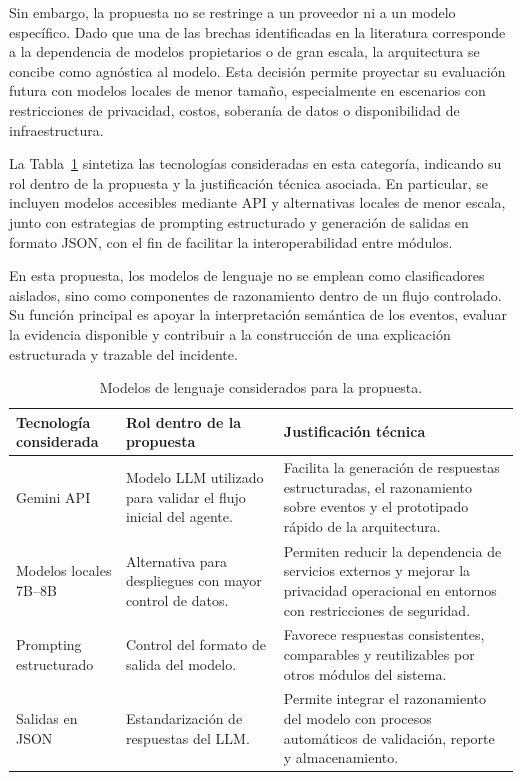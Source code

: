 Sin embargo, la propuesta no se restringe a un proveedor ni a un modelo específico. Dado que una de las brechas identificadas en la literatura corresponde a la dependencia de modelos propietarios o de gran escala, la arquitectura se concibe como agnóstica al modelo. Esta decisión permite proyectar su evaluación futura con modelos locales de menor tamaño, especialmente en escenarios con restricciones de privacidad, costos, soberanía de datos o disponibilidad de infraestructura.

La Tabla~\ref{tab:modelos_lenguaje} sintetiza las tecnologías consideradas en esta categoría, indicando su rol dentro de la propuesta y la justificación técnica asociada. En particular, se incluyen modelos accesibles mediante API y alternativas locales de menor escala, junto con estrategias de prompting estructurado y generación de salidas en formato JSON, con el fin de facilitar la interoperabilidad entre módulos.

En esta propuesta, los modelos de lenguaje no se emplean como clasificadores aislados, sino como componentes de razonamiento dentro de un flujo controlado. Su función principal es apoyar la interpretación semántica de los eventos, evaluar la evidencia disponible y contribuir a la construcción de una explicación estructurada y trazable del incidente.

\begin{table}[H]
\centering
\caption{Modelos de lenguaje considerados para la propuesta.}
\label{tab:modelos_lenguaje}
\renewcommand{\arraystretch}{1.25}
\begin{tabularx}{\textwidth}{p{2.4cm} X X}
\toprule
\textbf{Tecnología considerada} & \textbf{Rol dentro de la propuesta} & \textbf{Justificación técnica} \\
\midrule
Gemini API & Modelo LLM utilizado para validar el flujo inicial del agente. & Facilita la generación de respuestas estructuradas, el razonamiento sobre eventos y el prototipado rápido de la arquitectura. \\
\midrule
Modelos locales 7B--8B & Alternativa para despliegues con mayor control de datos. & Permiten reducir la dependencia de servicios externos y mejorar la privacidad operacional en entornos con restricciones de seguridad. \\
\midrule
Prompting estructurado & Control del formato de salida del modelo. & Favorece respuestas consistentes, comparables y reutilizables por otros módulos del sistema. \\
\midrule
Salidas en JSON & Estandarización de respuestas del LLM. & Permite integrar el razonamiento del modelo con procesos automáticos de validación, reporte y almacenamiento. \\
\bottomrule
\end{tabularx}
\end{table}


